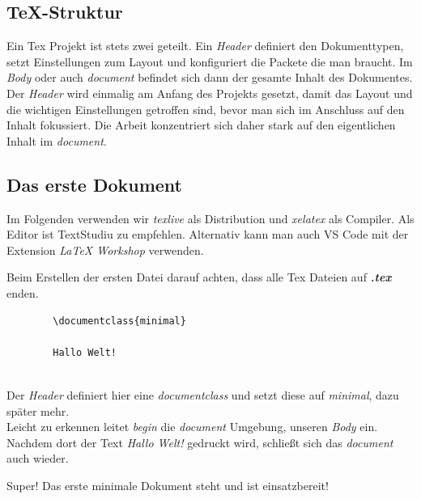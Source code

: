 \subsection{TeX-Struktur}
Ein Tex Projekt ist stets zwei geteilt.
Ein \textit{Header} definiert den Dokumenttypen, setzt Einstellungen zum Layout und konfiguriert die Packete die man braucht.
Im \textit{Body} oder auch \textit{document} befindet sich dann der gesamte Inhalt des Dokumentes.
Der \textit{Header} wird einmalig am Anfang des Projekts gesetzt, damit das Layout und die wichtigen Einstellungen getroffen sind, bevor man sich im Anschluss auf den Inhalt fokussiert. Die Arbeit konzentriert sich daher stark auf den eigentlichen Inhalt im \textit{document}.

\subsection{Das erste Dokument}
Im Folgenden verwenden wir \textit{texlive} als Distribution und \textit{xelatex} als Compiler.
Als Editor ist TextStudiu zu empfehlen. Alternativ kann man auch VS Code mit der Extension \textit{LaTeX Workshop} verwenden.

\begin{samepage}

    Beim Erstellen der ersten Datei darauf achten, dass alle Tex Dateien auf \textbf{\textit{.tex}} enden.

    \begin{verbatim}
        \documentclass{minimal}
        
        Hallo Welt!
        
    \end{verbatim}

    Der \textit{Header} definiert hier eine \textit{documentclass} und setzt diese auf \textit{minimal}, dazu später mehr. \\
    Leicht zu erkennen leitet \textit{begin} die \textit{document} Umgebung, unseren \textit{Body} ein. Nachdem dort der Text \textit{Hallo Welt!} gedruckt wird, schließt sich das \textit{document} auch wieder.

    Super! Das erste minimale Dokument steht und ist einsatzbereit!

\end{samepage}

\newpage